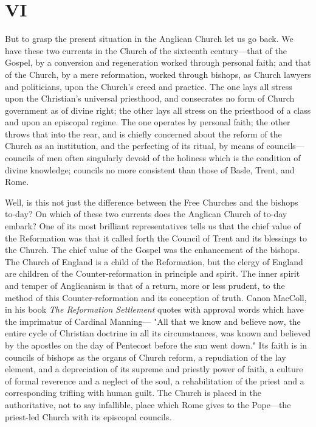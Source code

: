 \documentclass[12pt,a5paper,twoside]{book}
\begin{document}
\section*{VI}

But to grasp the present situation in the Anglican 
Church let us go back. We have these two currents 
in the Church of the sixteenth century---that of the 
Gospel, by a conversion and regeneration worked 
through personal faith; and that of the Church, by a 
mere reformation, worked through bishops, as Church 
lawyers and politicians, upon the Church's creed and 
practice. The one lays all stress upon the Christian's 
universal priesthood, and consecrates no form of 
Church government as of divine right; the other lays 
all stress on the priesthood of a class and upon an 
episcopal regime. The one operates by personal faith; 
the other throws that into the rear, and is chiefly concerned 
about the reform of the Church as an institution, 
and the perfecting of its ritual, by means of 
councils---councils of men often singularly devoid of 
the holiness which is the condition of divine knowledge;
councils no more consistent than those of 
Basle, Trent, and Rome. 

Well, is this not just the difference between the 
Free Churches and the bishops to-day? On which of 
these two currents does the Anglican Church of to-day 
embark? One of its most brilliant representatives 
tells us that the chief value of the Reformation was 
that it called forth the Council of Trent and its blessings 
to the Church. The chief value of the Gospel 
was the enhancement of the bishops. The Church of 
England is a child of the Reformation, but the clergy 
of England are children of the Counter-reformation in 
principle and spirit. The inner spirit and temper of 
Anglicanism is that of a return, more or less prudent, 
to the method of this Counter-reformation and its 
conception of truth. Canon MacColl, in his book 
\textit{The Reformation Settlement} quotes with approval words 
which have the imprimatur of Cardinal Manning---
"All that we know and believe now, the entire cycle 
of Christian doctrine in all its circumstances, was 
known and believed by the apostles on the day of 
Pentecost before the sun went down." Its faith is in 
councils of bishops as the organs of Church reform, a 
repudiation of the lay element, and a depreciation of 
its supreme and priestly power of faith, a culture of 
formal reverence and a neglect of the soul, a rehabilitation 
of the priest and a corresponding trifling with 
human guilt. The Church is placed in the authoritative, 
not to say infallible, place which Rome gives to 
the Pope---the priest-led Church with its episcopal 
councils. 
\end{document}
